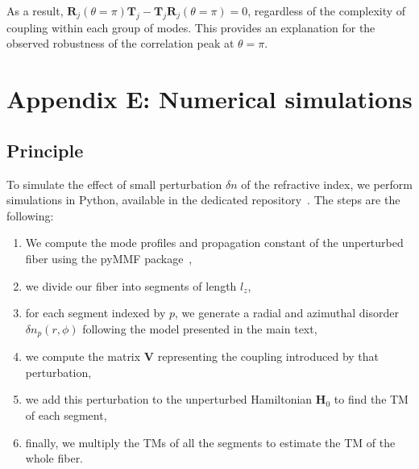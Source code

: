 \documentclass[aps,prl,twocolumn, amsmath,amssymb,superscriptaddress]{revtex4-2}
\begin{document}
As a result, $\mathbf{R}_j(\theta = \pi)\mathbf{T}_j-\mathbf{T}_j\mathbf{R}_j(\theta= \pi) = 0$, 
regardless of the complexity of coupling within each group of modes. 
This provides an explanation for the observed robustness of the correlation peak at $\theta=\pi$.


\section*{Appendix E: Numerical simulations}

\subsection*{Principle}

To simulate the effect of small perturbation $\delta n$ of the refractive index, 
we perform simulations in Python, available in the dedicated repository~\cite{repo}. 
The steps are the following:
\begin{enumerate}
    \item We compute the mode profiles and propagation constant of the unperturbed fiber using the pyMMF package~\cite{matthes2021learning,pyMMF},
    \item we divide our fiber into segments of length $l_z$,
    \item for each segment indexed by $p$, we generate a radial and azimuthal disorder $\delta n_p(r,\phi)$ 
    following the model presented in the main text,
    \item we compute the matrix $\mathbf{V}$ representing the coupling introduced by that perturbation, 
    \item we add this perturbation to the unperturbed Hamiltonian $\mathbf{H}_0$ to find the TM of each segment, 
    \item finally, we multiply the TMs of all the segments to estimate the TM of the whole fiber.
\end{enumerate}

\end{document}
